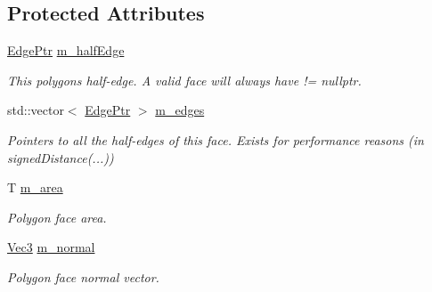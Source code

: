 \subsection*{Protected Attributes}
\begin{DoxyCompactItemize}
\item 
\mbox{\label{classDcel_1_1FaceT_afe66c3d93bb0ea04d9a0d263b2927bd3}} 
\hyperlink{classDcel_1_1FaceT_a0f3448c4cf108341e48029b8040c7cec}{Edge\+Ptr} \hyperlink{classDcel_1_1FaceT_afe66c3d93bb0ea04d9a0d263b2927bd3}{m\+\_\+half\+Edge}
\begin{DoxyCompactList}\small\item\em This polygon\textquotesingle{}s half-\/edge. A valid face will always have != nullptr. \end{DoxyCompactList}\item 
\mbox{\label{classDcel_1_1FaceT_a9228b5f27e1aa5c9eea36a7c27462e6c}} 
std\+::vector$<$ \hyperlink{classDcel_1_1FaceT_a0f3448c4cf108341e48029b8040c7cec}{Edge\+Ptr} $>$ \hyperlink{classDcel_1_1FaceT_a9228b5f27e1aa5c9eea36a7c27462e6c}{m\+\_\+edges}
\begin{DoxyCompactList}\small\item\em Pointers to all the half-\/edges of this face. Exists for performance reasons (in signed\+Distance(...)) \end{DoxyCompactList}\item 
\mbox{\label{classDcel_1_1FaceT_a572c463c60afb896c8cec667c964631f}} 
T \hyperlink{classDcel_1_1FaceT_a572c463c60afb896c8cec667c964631f}{m\+\_\+area}
\begin{DoxyCompactList}\small\item\em Polygon face area. \end{DoxyCompactList}\item 
\mbox{\label{classDcel_1_1FaceT_a886ee24ddf3dae99b836b39183a412ba}} 
\hyperlink{classDcel_1_1FaceT_ade9c182834ec6f18a0e17b8140308db2}{Vec3} \hyperlink{classDcel_1_1FaceT_a886ee24ddf3dae99b836b39183a412ba}{m\+\_\+normal}
\begin{DoxyCompactList}\small\item\em Polygon face normal vector. \end{DoxyCompactList}\item 
\mbox{\label{classDcel_1_1FaceT_a9a85e2c47be9ac4bbfe8620bc0773d6d}} 

\end{DoxyCompactItemize}
